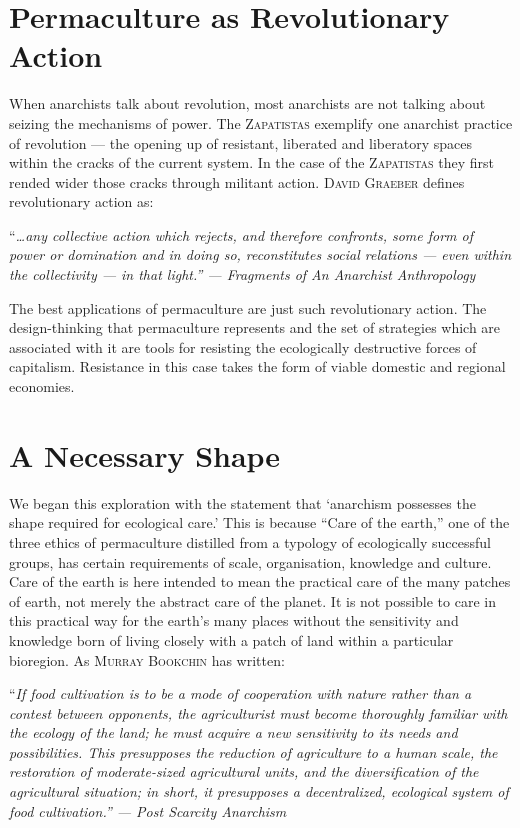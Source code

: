 \documentclass[a4paper, 11pt]{article}
\begin{document}
\begin{multicols*}{2}
\section*{Permaculture as Revolutionary Action}

When anarchists talk about revolution, most anarchists are not talking about seizing the mechanisms of power.  The \textsc{Zapatistas} exemplify one anarchist practice of revolution --- the opening up of resistant, liberated and liberatory spaces within the cracks of the current system.  In the case of the \textsc{Zapatistas} they first rended wider those cracks through militant action.  \textsc{David Graeber} defines revolutionary action as:

\vspace{1mm}
``\em{\ldots any collective action which rejects, and therefore confronts, some form of power or domination and in doing so, reconstitutes social relations --- even within the collectivity --- in that light.}\em'' --- \em{Fragments of An Anarchist Anthropology}\em
\vspace{1mm}

The best applications of permaculture are just such revolutionary action.  The design-thinking that permaculture represents and the set of strategies which are associated with it are tools for resisting the ecologically destructive forces of capitalism.  Resistance in this case takes the form of viable domestic and regional economies.

\section*{A Necessary Shape}

We began this exploration with the statement that `anarchism possesses the shape required for ecological care.' This is because ``Care of the earth,'' one of the three ethics of permaculture distilled from a typology of ecologically successful groups, has certain requirements of scale, organisation, knowledge and culture.  Care of the earth is here intended to mean the practical care of the many patches of earth, not merely the abstract care of the planet.  It is not possible to care in this practical way for the earth's many places without the sensitivity and knowledge born of living closely with a patch of land within a particular bioregion.  As \textsc{Murray Bookchin} has written:

\vspace{1mm}
``\em{If food cultivation is to be a mode of cooperation with nature rather than a contest between opponents, the agriculturist must become thoroughly familiar with the ecology of the land; he must acquire a new sensitivity to its needs and possibilities. This presupposes the reduction of agriculture to a human scale, the restoration of moderate-sized agricultural units, and the diversification of the agricultural situation; in short, it presupposes a decentralized, ecological system of food cultivation.}\em'' --- \em{Post Scarcity Anarchism}\em
\vspace{1mm}


\end{multicols*}
\end{document}
